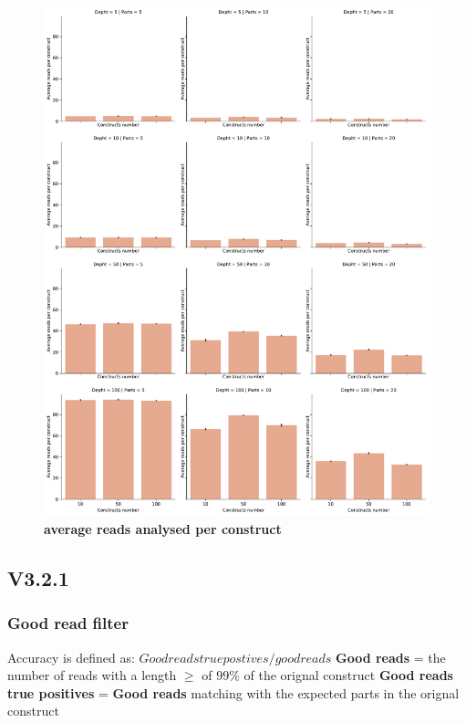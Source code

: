 \documentclass[11pt, a4paper]{article}
\begin{document}
\begin{figure}[ht]
    \begin{center}
    \includegraphics[width=1\textwidth]{../results/images_notebook/v_312/average_reads.pdf}
    \end{center}
    \caption{{\bf average reads analysed per construct }}
   \label{fig:v_312_average_reads}
\end{figure}

\clearpage

\subsection{V3.2.1 }
\subsubsection{Good read filter}
Accuracy is defined as:
$Good reads true postives/ good reads$
\textbf{Good reads} = the number of reads with a length $\geq$ of $99\%$ of the orignal construct
\textbf{Good reads true positives} = \textbf{Good reads} matching with the expected parts in the orignal construct
\end{document}
